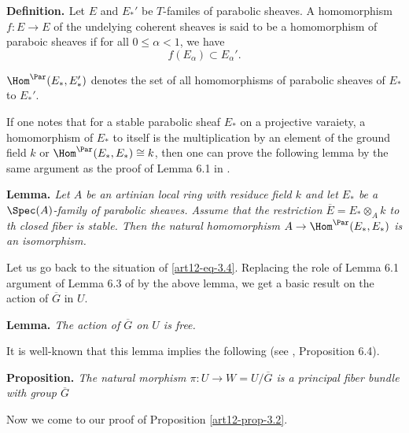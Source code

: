 \medskip
\noindent
{\bfseries {} Definition. \label{art12-definition-3.6}}  Let $E$ and $E_{*}'$ be $T$-familes of parabolic sheaves. A homomorphism $f: E \rightarrow E$ of the undelying coherent sheaves is said to be a homomorphism of paraboic sheaves if for all $0 \leq \alpha < 1$, we have
$$
f(E_{\alpha}) \subset E_{\alpha}'.
$$

$\Hom^{\Par}(E_{*}, E_{*}')$ denotes the set of all homomorphisms of parabolic sheaves of $E_{*}$ to $E_{*}'$.

If one notes that for a stable parabolic sheaf $E_{*}$ on a projective varaiety, a homomorphism of $E_{*}$ to itself is the multiplication by an element of the ground field $k$ or $\Hom^{\Par}(E_{*}, E_{*}) \cong k$, then one can prove the following lemma by the same argument as the proof of Lemma 6.1 in \cite{art12-key5}.

\medskip
\noindent
{\bfseries {} Lemma. \label{art12-Lemma-3.7}} \textit{Let $A$ be an artinian local ring with residuce field $k$ and let $E_{*}$ be a $\Spec(A)$-family of parabolic sheaves. Assume that the restriction $\overline{E}=E_{*}\otimes_{A} k$ to th closed fiber is stable. Then the natural homomorphism $A\rightarrow \Hom^{\Par}(E_{*}, E_{*})$ is an isomorphism.}

 Let us  go back to the situation of \eqref{art12-eq-3.4}. Replacing the role of Lemma 6.1 argument of Lemma 6.3 of
 \cite{art12-key5} by the above lemma, we get a basic result on the action of $\overline{G}$ in $U$.

\medskip
\noindent
{\bfseries {} Lemma. \label{art12-Lemma-3.8}}\textit{The action of $\overline{G}$ on $U$ is free.}

 It is well-known that this lemma implies the following (see \cite{art12-key5}, Proposition 6.4).

\medskip
\noindent
{\bfseries {} Proposition. \label{art12-prop-3.9}}\textit{The natural morphism
$\pi : U \rightarrow W = U/\overline{G}$ is a principal fiber bundle with group $\overline{G}$}

Now we come to our proof of Proposition \ref{art12-prop-3.2}.

